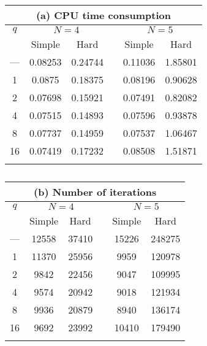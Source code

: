 \documentclass{aip-cp}
\begin{document}
\begin{table}[h]
	\caption{}
	\label{tab:mixedResults}
	\begin{minipage}{0.49\linewidth}
	\begin{tabular}{cccccc}
		\multicolumn{6}{c}{(a) CPU time consumption }\\
		\hline\noalign{\smallskip}
		$q$ & \multicolumn{2}{c}{ $N=4$ } & & \multicolumn{2}{c}{$N=5$} \\
		\noalign{\smallskip} \cline{2-3} \cline{5-6} \noalign{\smallskip}
		 & Simple & Hard & & Simple & Hard  \\
		\noalign{\smallskip} \hline \noalign{\smallskip}		
--- &	0.08253 & 0.24744 & & 0.11036 &	1.85801 \\
 1  &	0.0875  & 0.18375 & & 0.08196 &	0.90628 \\
 2	&   0.07698	& 0.15921 & & 0.07491 & 0.82082 \\
 4  &   0.07515 & 0.14893 & & 0.07596 & 0.93878 \\
 8  &   0.07737 & 0.14959 & & 0.07537 & 1.06467 \\
16  &   0.07419 & 0.17232 & & 0.08508 & 1.51871 \\
		\noalign{\smallskip}\hline
	\end{tabular} 
	\end{minipage}

	\begin{minipage}{0.49\linewidth}
	\begin{tabular}{cccccc}
		\multicolumn{6}{c}{(b) Number of iterations}\\
		\hline\noalign{\smallskip}
		$q$ & \multicolumn{2}{c}{ $N=4$ } & & \multicolumn{2}{c}{$N=5$} \\
		\noalign{\smallskip} \cline{2-3} \cline{5-6} \noalign{\smallskip}
		 & Simple & Hard & & Simple & Hard  \\
		\noalign{\smallskip} \hline \noalign{\smallskip}
--- &  12558 & 37410 & & 15226 & 248275 \\
1   &  11370 & 25956 & &  9959 & 120978 \\
2	&   9842 & 22456 & &  9047 & 109995 \\
4   &   9574 & 20942 & &  9018 & 121934 \\
8   &   9936 & 20879 & &  8940 & 136174 \\
16	&   9692 & 23992 & & 10410 & 179490 \\
		\noalign{\smallskip}\hline
	\end{tabular}
	\end{minipage}
\end{table}
\end{document}
